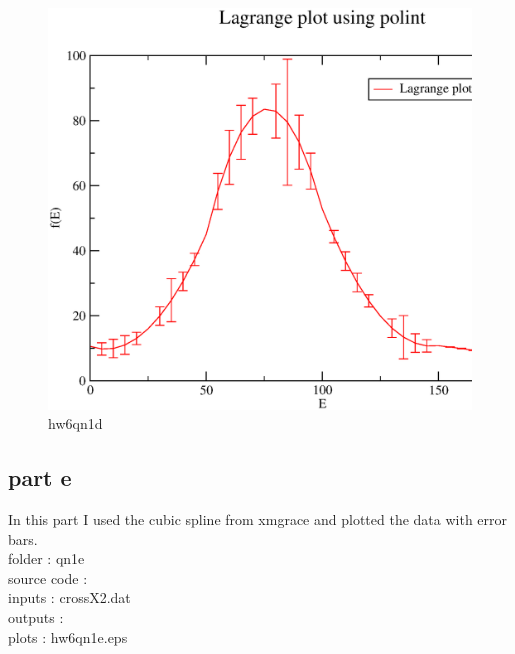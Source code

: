 \documentclass[11pt,a4paper,english]{article}
\begin{document}
	\begin{figure}[h!]
	\centering
	\includegraphics [scale=0.6]{hw6qn1d.eps}
	\caption{hw6qn1d }
	\end{figure}
	\clearpage

	
	\subsection{part e}
In this part I used the cubic spline from xmgrace and plotted the
data with error bars.\\
    folder       : qn1e\\
	source code  :\\ 
	inputs       : crossX2.dat\\
	outputs      : \\
	plots        : hw6qn1e.eps\\
	
\end{document}
